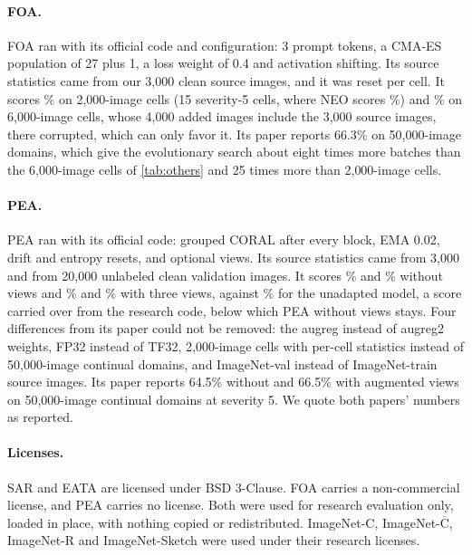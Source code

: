 \documentclass{article}
\newcommand{\neo}{NEO}
\begin{document}
\paragraph{FOA.} FOA ran with its official code and configuration: 3 prompt tokens, a CMA-ES population of 27 plus 1, a loss weight of 0.4 and activation shifting. Its source statistics came from our 3{,}000 clean source images, and it was reset per cell. It scores \% on 2{,}000-image cells (15 severity-5 cells, where \neo{} scores \%) and \% on 6{,}000-image cells, whose 4{,}000 added images include the 3{,}000 source images, there corrupted, which can only favor it. Its paper reports 66.3\% on 50{,}000-image domains, which give the evolutionary search about eight times more batches than the 6{,}000-image cells of \cref{tab:others} and 25 times more than 2{,}000-image cells.

\paragraph{PEA.} PEA ran with its official code: grouped CORAL after every block, EMA 0.02, drift and entropy resets, and optional views. Its source statistics came from 3{,}000 and from 20{,}000 unlabeled clean validation images. It scores \% and \% without views and \% and \% with three views, against \% for the unadapted model, a score carried over from the research code, below which PEA without views stays. Four differences from its paper could not be removed: the augreg instead of augreg2 weights, FP32 instead of TF32, 2{,}000-image cells with per-cell statistics instead of 50{,}000-image continual domains, and ImageNet-val instead of ImageNet-train source images. Its paper reports 64.5\% without and 66.5\% with augmented views on 50{,}000-image continual domains at severity 5. We quote both papers' numbers as reported.

\paragraph{Licenses.} SAR and EATA are licensed under BSD 3-Clause. FOA carries a non-commercial license, and PEA carries no license. Both were used for research evaluation only, loaded in place, with nothing copied or redistributed. ImageNet-C, ImageNet-$\overline{\text{C}}$, ImageNet-R and ImageNet-Sketch were used under their research licenses.
\end{document}
